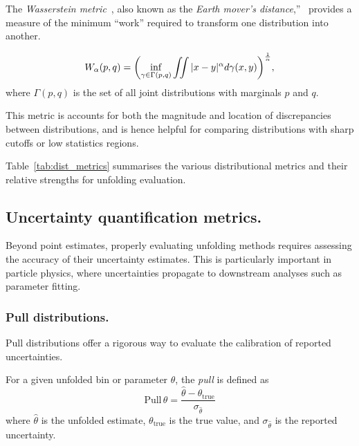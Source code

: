             The \emph{Wasserstein metric}~\cite{L.N.VasersteinIssue3Pagesnobr6472/nobr}, also known as the \emph{Earth mover's distance},''~\cite{rubner_metric_1998} provides a measure of the minimum ``work'' required to transform one distribution into another.
        \begin{definition}
            \begin{equation}
            W_\alpha(p, q) = \qty(\inf_{\gamma \in \Gamma(p, q)} \iint |x-y|^\alpha d\gamma(x, y))^{\frac1\alpha},
        \end{equation}
        where \(\Gamma(p, q)\) is the set of all joint distributions with marginals \(p\) and \(q\).
    \end{definition}

        This metric is accounts for both the magnitude and location of discrepancies between distributions, and is hence helpful for comparing distributions with sharp cutoffs or low statistics regions.

        Table~\ref{tab:dist_metrics} summarises the various distributional metrics and their relative strengths for unfolding evaluation.
        

        \subsection{Uncertainty quantification metrics.}
        Beyond point estimates, properly evaluating unfolding methods requires assessing the accuracy of their uncertainty estimates. 
        This is particularly important in particle physics, where uncertainties propagate to downstream analyses such as parameter fitting.

        \subsubsection{Pull distributions.}
        \label{subsubsec:pull-distributions}
            Pull distributions offer a rigorous way to evaluate the calibration of reported uncertainties.
            
            \begin{definition} For a given unfolded bin or parameter \(\theta\), the \emph{pull} is defined as
            \begin{equation}
                \text{Pull}\,{\theta} = \frac{\hat{\theta} - \theta_{\text{true}}}{\sigma_{\hat{\theta}}}
            \end{equation}
            where \(\hat{\theta}\) is the unfolded estimate, \(\theta_{\text{true}}\) is the true value, and \(\sigma_{\hat{\theta}}\) is the reported uncertainty.
        \end{definition}

